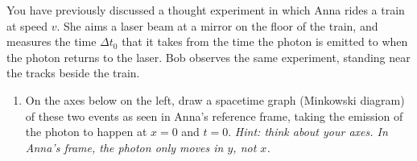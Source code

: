 You have previously discussed a thought experiment in which Anna rides a train at speed $v$.  She aims a laser beam at a mirror on the floor of the train, and measures the time $\Delta t_0$ that it takes from the time the photon is 
emitted to when the photon returns to the laser.  Bob observes the same experiment, standing near the tracks beside the train.  

\begin{enumerate}[labparts]

\item  
On the axes below on the left, draw a spacetime graph (Minkowski diagram) of these two events as seen in Anna's reference frame, taking the emission of the photon to happen at $x=0$ and $t=0$.  \textit{Hint: think about your axes.  In Anna's frame, the photon only moves in $y$, not $x$.}
\end{enumerate}


